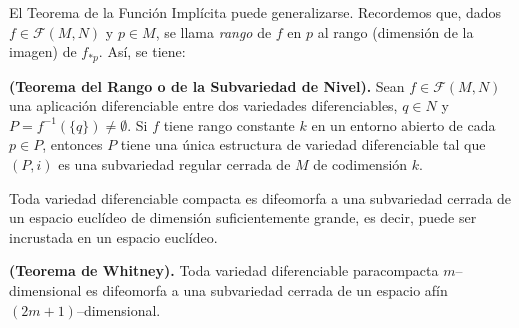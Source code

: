 \documentclass[Cursovd_portada.tex]{subfiles}
\begin{document}
\newpage

El Teorema de la Función Implícita puede generalizarse.
Recordemos que, dados $f\in \mathcal{F}(M,N)$ y $p \in M$, se
llama {\it rango} de $f$ en $p$ al rango (dimensión de la
imagen) de $f_{*p}$. Así, se tiene:

\begin{teorema}
{\bf (Teorema del Rango o de la Subvariedad de Nivel).} Sean
$f\in\mathcal{F}(M,N)$ una aplicación diferenciable entre dos
variedades diferenciables, $q\in N$ y
$P=f^{-1}(\{q\})\neq\emptyset$. Si $f$ tiene rango constante $k$
en un entorno abierto de cada $p\in P$, entonces $P$ tiene una
única estructura de variedad diferenciable tal que $(P,i)$ es
una subvariedad regular cerrada de $M$ de codimensión $k$.
\end{teorema}

\begin{teorema}
Toda variedad diferenciable compacta es difeomorfa a una subvariedad cerrada de un espacio euclídeo de dimensión
suficientemente grande, es decir, puede ser incrustada en un espacio euclídeo.
\end{teorema}
\begin{teorema}
{\bf (Teorema de Whitney).} Toda variedad diferenciable paracompacta $m$--dimensional es difeomorfa a una
subvariedad cerrada de un espacio afín $(2m+1)$--dimensional.
\end{teorema}
\end{document}
